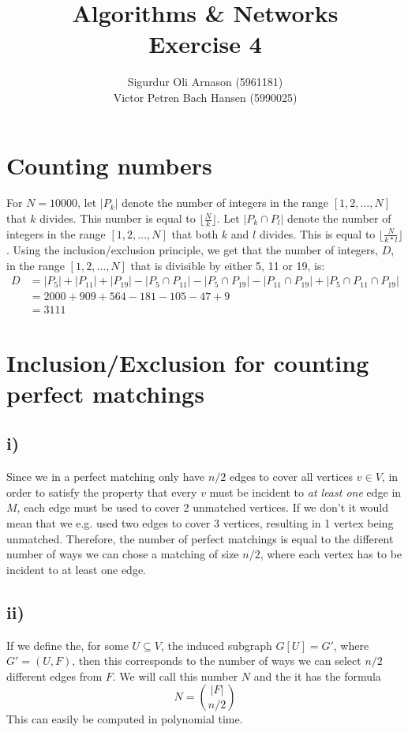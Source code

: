 \documentclass[a4paper]{article}
\author{Sigurdur Oli Arnason (5961181) \\ Victor Petren Bach Hansen (5990025)}
\title{Algorithms \& Networks \\ Exercise 4}
\begin{document}
\maketitle
\section{Counting numbers}
For $N=10000$, let $|P_k|$ denote the number of integers in the range $[1,2,\ldots,N]$ that $k$ divides. This number is equal to $\lfloor \frac{N}{k}\rfloor $. Let $|P_k \cap P_l|$ denote the number of integers in the range $[1,2,\ldots,N]$ that both $k$ and $l$ divides. This is equal to $\lfloor \frac{N}{k*l}\rfloor $. Using the inclusion/exclusion principle, we get that the number of integers, $D$, in the range $[1,2,\ldots, N]$ that is divisible by either 5, 11 or 19, is:
\begin{align*}
  D &=|P_5|+|P_{11}| + |P_{19}|-|P_{5}\cap P_{11}|-|P_{5}\cap P_{19}|-|P_{11}\cap P_{19}|+|P_{5}\cap P_{11} \cap P_{19} |\\
    &= 2000+909+564-181-105-47+9\\
    &= 3111
\end{align*}

\section{Inclusion/Exclusion for counting perfect matchings}
\subsection*{i)}
Since we in a perfect matching only have $n/2$ edges to cover all vertices $v\in V$, in order to satisfy the property that every $v$ must be incident to \textit{at least one} edge in $M$, each edge must be used to cover 2 unmatched vertices. If we don't it would mean that we e.g. used two edges to cover 3 vertices, resulting in 1 vertex being unmatched. Therefore, the number of perfect matchings is equal to the different number of ways we can chose a matching of size $n/2$, where each vertex has
to be incident to at least one edge.
\subsection*{ii)}
If we define the, for some $U \subseteq V $, the induced subgraph $G[U]=G'$, where $G'=(U,F)$, then this corresponds to the number of ways we can select $n/2$ different edges from $F$. We will call this number $N$ and the it has the formula
$$
  N=\binom{|F|}{n/2}
$$
This can easily be computed in polynomial time.
\end{document}
